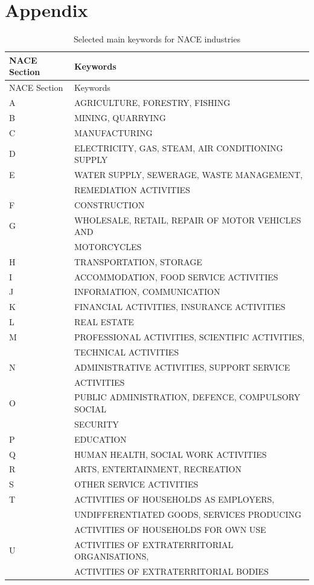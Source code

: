 \documentclass[
  11,
  a4paperpaper,
]{article}
\let\oldsection\section
\renewcommand\section{\clearpage\oldsection}
\begin{document}
\newpage{}

\section*{Appendix}\label{sec-appendix}

\label{tbl-nacemainkeywords}
\begin{longtable}[]{@{}ll@{}}
\caption{\label{tbl-nacemainkeywords}Selected main keywords for NACE
industries}\tabularnewline
\toprule\noalign{}
NACE Section & Keywords \\
\midrule\noalign{}
\endfirsthead
\toprule\noalign{}
NACE Section & Keywords \\
\midrule\noalign{}
\endhead
\bottomrule\noalign{}
\endlastfoot
A & AGRICULTURE, FORESTRY, FISHING \\
B & MINING, QUARRYING \\
C & MANUFACTURING \\
D & ELECTRICITY, GAS, STEAM, AIR CONDITIONING SUPPLY \\
E & WATER SUPPLY, SEWERAGE, WASTE MANAGEMENT, \\
& REMEDIATION ACTIVITIES \\
F & CONSTRUCTION \\
G & WHOLESALE, RETAIL, REPAIR OF MOTOR VEHICLES AND \\
& MOTORCYCLES \\
H & TRANSPORTATION, STORAGE \\
I & ACCOMMODATION, FOOD SERVICE ACTIVITIES \\
J & INFORMATION, COMMUNICATION \\
K & FINANCIAL ACTIVITIES, INSURANCE ACTIVITIES \\
L & REAL ESTATE \\
M & PROFESSIONAL ACTIVITIES, SCIENTIFIC ACTIVITIES, \\
& TECHNICAL ACTIVITIES \\
N & ADMINISTRATIVE ACTIVITIES, SUPPORT SERVICE \\
& ACTIVITIES \\
O & PUBLIC ADMINISTRATION, DEFENCE, COMPULSORY SOCIAL \\
& SECURITY \\
P & EDUCATION \\
Q & HUMAN HEALTH, SOCIAL WORK ACTIVITIES \\
R & ARTS, ENTERTAINMENT, RECREATION \\
S & OTHER SERVICE ACTIVITIES \\
T & ACTIVITIES OF HOUSEHOLDS AS EMPLOYERS, \\
& UNDIFFERENTIATED GOODS, SERVICES PRODUCING \\
& ACTIVITIES OF HOUSEHOLDS FOR OWN USE \\
U & ACTIVITIES OF EXTRATERRITORIAL ORGANISATIONS, \\
& ACTIVITIES OF EXTRATERRITORIAL BODIES \\
\end{longtable}
\end{document}
